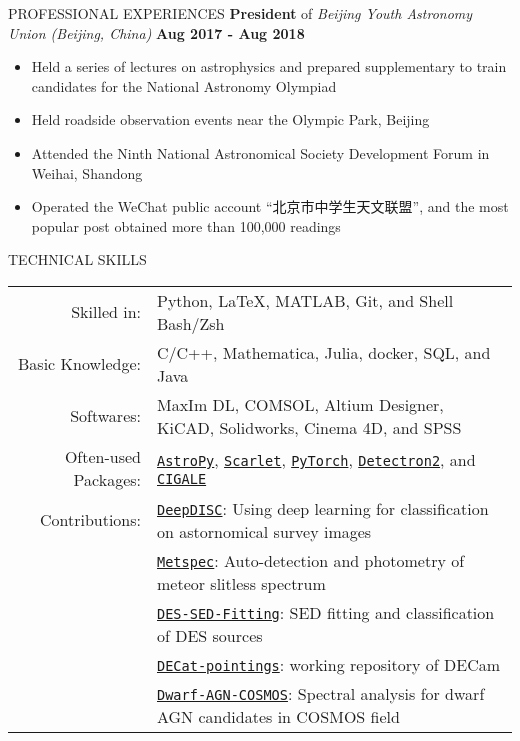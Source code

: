 \documentclass[10pt]{article} %
\begin{document}
\begin{section}{PROFESSIONAL EXPERIENCES}
\textbf{President} of \textit{Beijing Youth Astronomy Union (Beijing, China)} \hfill \textbf{Aug 2017 - Aug 2018} 
\begin{itemize}[leftmargin=1.5em]
    \item Held a series of lectures on astrophysics and prepared supplementary to train candidates for the National Astronomy Olympiad
    \item Held roadside observation events near the Olympic Park, Beijing
    \item Attended the Ninth National Astronomical Society Development Forum in Weihai, Shandong
    \item Operated the WeChat public account “北京市中学生天文联盟”, and the most popular post obtained more than 100,000 readings
\end{itemize}

\end{section}

\begin{section}{TECHNICAL SKILLS}

\begin{tabular}{rl}
    Skilled in: & Python, \LaTeX, MATLAB, Git, and Shell Bash/Zsh \\
    Basic Knowledge: & C/C++, Mathematica, Julia, docker, SQL, and Java \\
    Softwares: & MaxIm DL, COMSOL, Altium Designer, KiCAD, Solidworks, Cinema 4D, and SPSS \\
    Often-used Packages: & \href{https://www.astropy.org/}{\texttt{AstroPy}}, \href{https://github.com/pmelchior/scarlet}{\texttt{Scarlet}}, \href{https://pytorch.org/}{\texttt{PyTorch}}, \href{https://github.com/facebookresearch/detectron2}{\texttt{Detectron2}}, and \href{https://cigale.lam.fr/}{\texttt{CIGALE}} \\
    Contributions: & \href{https://github.com/burke86/deepdisc}{\texttt{DeepDISC}}: Using deep learning for classification on astornomical survey images \\
    & \href{https://github.com/Chisen-Lupus/metspec}{\texttt{Metspec}}: Auto-detection and photometry of meteor slitless spectrum \\
    & \href{https://github.com/Chisen-Lupus/DES-SED-fitting}{\texttt{DES-SED-Fitting}}: SED fitting and classification of DES sources \\
    & \href{https://github.com/gnarayan/decat_pointings}{\texttt{DECat-pointings}}: working repository of DECam \\
    & \href{https://github.com/burke86/dwarf_agn_cosmos}{\texttt{Dwarf-AGN-COSMOS}}: Spectral analysis for dwarf AGN candidates in COSMOS field
\end{tabular}

\end{section} 
\end{document}
